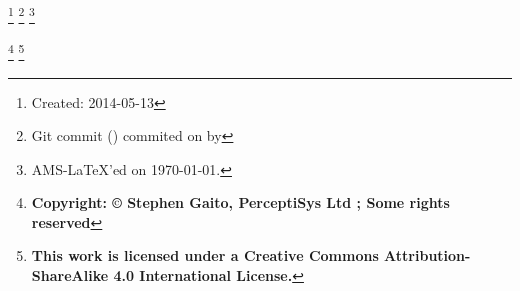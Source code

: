 \author{Stephen Gaito}
\address{PerceptiSys Ltd, 21 Gregory Ave, Coventry, CV3 6DJ, United Kingdom}%
%


\thanks{Created: 2014-05-13}
\thanks{Git commit \gitReferences{} (\gitAbbrevHash{}) commited on \gitAuthorDate{} by \gitAuthorName{}}
\thanks{AMS-\LaTeX{}'ed on \today{}.}

\thanks{\textbf{Copyright: \copyright{} Stephen Gaito, PerceptiSys Ltd \the\year{}; Some rights reserved}}
\thanks{\textbf{This work is licensed under a Creative Commons Attribution-ShareAlike 4.0 International License.}}
